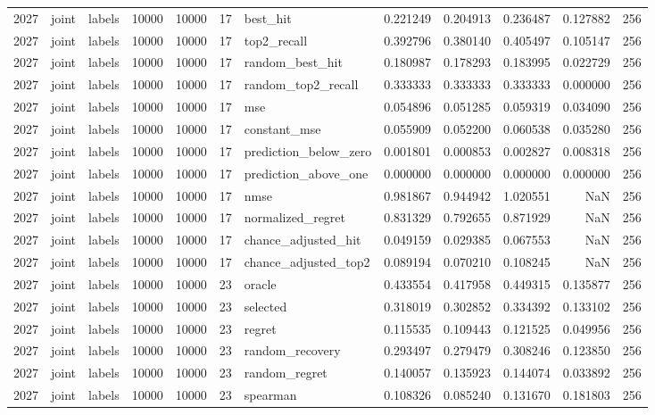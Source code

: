 \begin{tabular}{rllrrrlrrrrr}
2027 & joint & labels & 10000 & 10000 & 17 & best_hit & 0.221249 & 0.204913 & 0.236487 & 0.127882 & 256 \\
2027 & joint & labels & 10000 & 10000 & 17 & top2_recall & 0.392796 & 0.380140 & 0.405497 & 0.105147 & 256 \\
2027 & joint & labels & 10000 & 10000 & 17 & random_best_hit & 0.180987 & 0.178293 & 0.183995 & 0.022729 & 256 \\
2027 & joint & labels & 10000 & 10000 & 17 & random_top2_recall & 0.333333 & 0.333333 & 0.333333 & 0.000000 & 256 \\
2027 & joint & labels & 10000 & 10000 & 17 & mse & 0.054896 & 0.051285 & 0.059319 & 0.034090 & 256 \\
2027 & joint & labels & 10000 & 10000 & 17 & constant_mse & 0.055909 & 0.052200 & 0.060538 & 0.035280 & 256 \\
2027 & joint & labels & 10000 & 10000 & 17 & prediction_below_zero & 0.001801 & 0.000853 & 0.002827 & 0.008318 & 256 \\
2027 & joint & labels & 10000 & 10000 & 17 & prediction_above_one & 0.000000 & 0.000000 & 0.000000 & 0.000000 & 256 \\
2027 & joint & labels & 10000 & 10000 & 17 & nmse & 0.981867 & 0.944942 & 1.020551 & NaN & 256 \\
2027 & joint & labels & 10000 & 10000 & 17 & normalized_regret & 0.831329 & 0.792655 & 0.871929 & NaN & 256 \\
2027 & joint & labels & 10000 & 10000 & 17 & chance_adjusted_hit & 0.049159 & 0.029385 & 0.067553 & NaN & 256 \\
2027 & joint & labels & 10000 & 10000 & 17 & chance_adjusted_top2 & 0.089194 & 0.070210 & 0.108245 & NaN & 256 \\
2027 & joint & labels & 10000 & 10000 & 23 & oracle & 0.433554 & 0.417958 & 0.449315 & 0.135877 & 256 \\
2027 & joint & labels & 10000 & 10000 & 23 & selected & 0.318019 & 0.302852 & 0.334392 & 0.133102 & 256 \\
2027 & joint & labels & 10000 & 10000 & 23 & regret & 0.115535 & 0.109443 & 0.121525 & 0.049956 & 256 \\
2027 & joint & labels & 10000 & 10000 & 23 & random_recovery & 0.293497 & 0.279479 & 0.308246 & 0.123850 & 256 \\
2027 & joint & labels & 10000 & 10000 & 23 & random_regret & 0.140057 & 0.135923 & 0.144074 & 0.033892 & 256 \\
2027 & joint & labels & 10000 & 10000 & 23 & spearman & 0.108326 & 0.085240 & 0.131670 & 0.181803 & 256 \\

\end{tabular}
